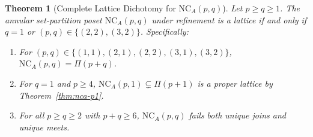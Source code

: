 \documentclass[11pt]{article}
\newtheorem{theorem}{Theorem}[section]
\theoremstyle{definition}
\newcommand{\NCA}{\mathrm{NC}_A}
\begin{document}
\begin{theorem}[Complete Lattice Dichotomy for $\NCA(p,q)$]\label{thm:nca-dichotomy}
Let $p \ge q \ge 1$. The annular set-partition poset $\NCA(p,q)$ under refinement is a lattice if and only if $q = 1$ or $(p,q) \in \{(2,2), (3,2)\}$. Specifically:
\begin{enumerate}
  \item For $(p,q) \in \{(1,1), (2,1), (2,2), (3,1), (3,2)\}$, $\NCA(p,q) = \Pi(p+q)$.
  \item For $q = 1$ and $p \ge 4$, $\NCA(p,1) \subsetneq \Pi(p+1)$ is a proper lattice by Theorem~\ref{thm:nca-p1}.
  \item For all $p \ge q \ge 2$ with $p + q \ge 6$, $\NCA(p,q)$ fails both unique joins and unique meets.
\end{enumerate}
\end{theorem}
\end{document}
